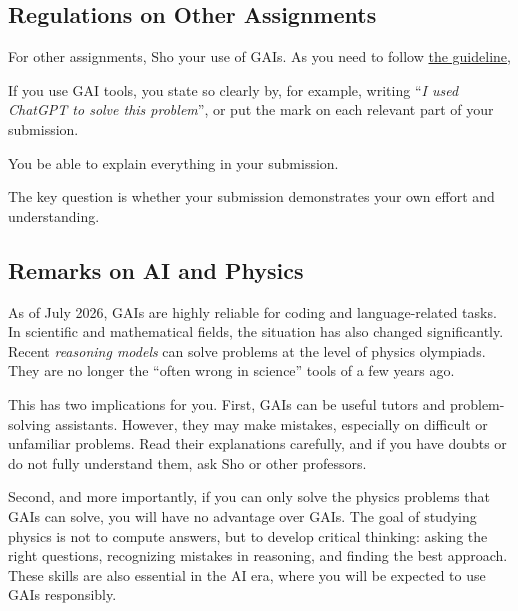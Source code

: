 \documentclass[11pt,pdfa,lastpage,minititle]{MishoNote}
\begin{document}
\subsection*{Regulations on Other Assignments}
For other assignments, Sho  your use of GAIs.
As you need to follow \href{https://misho104.github.io/LecturePublic/submission_guideline.pdf}{the guideline},
\begin{miniitemize}
  \item If you use GAI tools, you  state so clearly by, for example, writing ``\emph{I used ChatGPT to solve this problem}'', or put the mark {\color{pBlue}} on each relevant part of your submission.
  \item You  be able to explain everything in your submission.
\end{miniitemize}
The key question is whether your submission demonstrates your own effort and understanding.

\subsection*{Remarks on AI and Physics}
As of July 2026, GAIs are highly reliable for coding and language-related tasks.
In scientific and mathematical fields, the situation has also changed significantly.
Recent \emph{reasoning models} can solve problems at the level of physics olympiads.
They are no longer the ``often wrong in science'' tools of a few years ago.

This has two implications for you.
First, GAIs can be useful tutors and problem-solving assistants.
However, they may make mistakes, especially on difficult or unfamiliar problems.
Read their explanations carefully, and if you have doubts or do not fully understand them, ask Sho or other professors.

Second, and more importantly, if you can only solve the physics problems that GAIs can solve, you will have no advantage over GAIs.
The goal of studying physics is not to compute answers, but to develop critical thinking: asking the right questions, recognizing mistakes in reasoning, and finding the best approach.
These skills are also essential in the AI era, where you will be expected to use GAIs responsibly.
\end{document}
